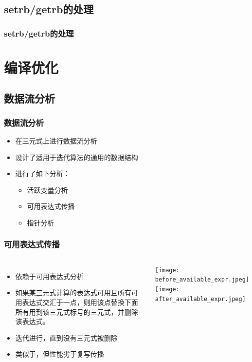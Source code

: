 \documentclass{beamer}
\begin{document}
\subsection{setrb/getrb的处理}
\begin{frame}
\frametitle{setrb/getrb的处理}
\end{frame}

\section{编译优化}
\subsection{数据流分析}
\begin{frame}
	\frametitle{数据流分析}
	\noindent
	\begin{itemize}
		\item 在三元式上进行数据流分析
		\item 设计了适用于迭代算法的通用的数据结构
		\item 进行了如下分析：
		\begin{itemize}
			\item 活跃变量分析
			\item \alert{可用表达式传播}
			\item \alert{指针分析}
		\end{itemize}
	\end{itemize}
\end{frame}
\begin{frame}
	\frametitle{可用表达式传播}
	\begin{columns}
		\begin{itemize}
			\item 依赖于可用表达式分析
			\item 如果某三元式计算的表达式可用且所有可用表达式交汇于一点，则用该点替换下面所有用到该三元式标号的三元式，并删除该表达式。
			\item 迭代进行，直到没有三元式被删除
			\item \alert{类似于，但性能劣于复写传播}
		\end{itemize}
		\begin{columns}
			\texttt{[image: before\_available\_expr.jpeg]}
			\texttt{[image: after\_available\_expr.jpeg]}
		\end{columns}
	\end{columns}
\end{frame}
\end{document}
